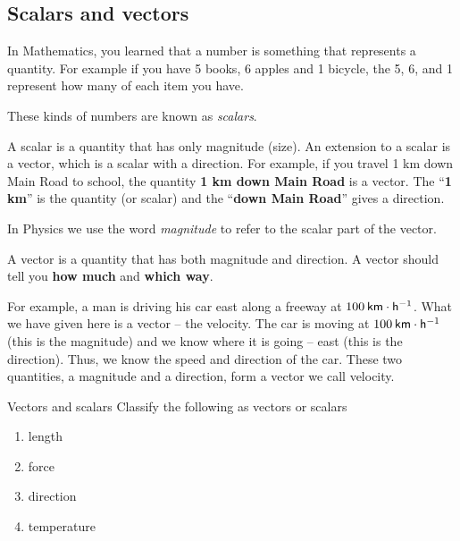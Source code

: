             \subsection*{Scalars and vectors}
            \nopagebreak
      \label{m38812*id186720}In Mathematics, you learned that a number is something that represents a quantity. For example if you have 5 books, 6 apples and 1 bicycle, the 5, 6, and 1 represent how many of each item you have.\par 
      \label{m38812*id186725}These kinds of numbers are known as \textsl{scalars}.\par 
{} {A scalar is a quantity that has only magnitude (size).  } 
      \label{m38812*id186750}An extension to a scalar is a vector, which is a scalar with a direction. For example, if you travel 1 km down Main Road to school, the quantity \textbf{1 km down Main Road} is a vector. The ``\textbf{1 km}'' is the quantity (or scalar) and the ``\textbf{down Main Road}'' gives a direction.\par 
      \label{m38812*id186771}In Physics we use the word \textsl{magnitude} to refer to the scalar part of the vector.\par 
{} { A vector is a quantity that has both magnitude and direction.  } 
      \label{m38812*id186797}A vector should tell you \textbf{how much} and \textbf{which way}.\par 
      \label{m38812*id186810}For example, a man is driving his car east along a freeway at $100\phantom{\rule{2pt}{0ex}}\mathsf{km}\ensuremath{\cdot}\mathsf{h}{}^{-1}$. What we have given here is a vector -- the velocity. The car is moving at $100\phantom{\rule{2pt}{0ex}}\mathsf{km}\ensuremath{\cdot}\mathsf{h}{}^{-1}$ (this is the magnitude) and we know where it is going -- east (this is the direction). Thus, we know the speed and direction of the car. These two quantities, a magnitude and a direction, form a vector we call velocity.\par 
\begin{exercises}{Vectors and scalars}
Classify the following as vectors or scalars
 \begin{enumerate}[noitemsep,label=\textbf{\arabic*}.]
  \item length
\item force
\item direction
\item temperature
 \end{enumerate}
\end{exercises}

